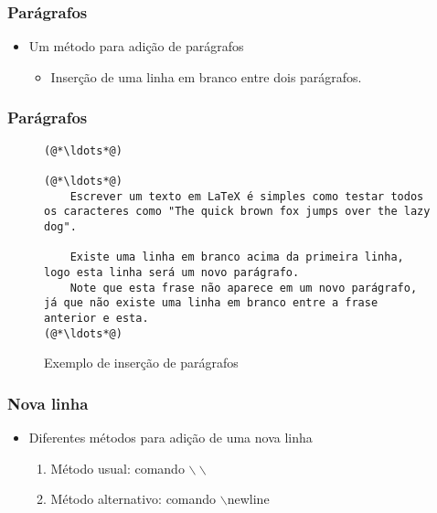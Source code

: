 \begin{frame} \frametitle{Parágrafos}
\begin{itemize}
	\item Um método para adição de parágrafos
	\begin{itemize}
		\item Inserção de uma linha em branco entre dois parágrafos.
	\end{itemize}
\end{itemize}
\end{frame}

\begin{frame}[fragile] \frametitle{Parágrafos}
\begin{figure}[!t]
\caption{Exemplo de inserção de parágrafos}
\begin{lstlisting}
(@*\ldots*@)

(@*\ldots*@)
	Escrever um texto em LaTeX é simples como testar todos os caracteres como "The quick brown fox jumps over the lazy dog".

	Existe uma linha em branco acima da primeira linha, logo esta linha será um novo parágrafo.
	Note que esta frase não aparece em um novo parágrafo, já que não existe uma linha em branco entre a frase anterior e esta.
(@*\ldots*@)

\end{lstlisting}
\ownsrc
\end{figure}
\end{frame}

\begin{frame}[fragile] \frametitle{Nova linha}
\begin{itemize}
	\item Diferentes métodos para adição de uma nova linha
	\begin{enumerate}
		\item Método usual: comando $\backslash\backslash$
		\item Método alternativo: comando $\backslash$newline
	\end{enumerate}
\end{itemize}
\end{frame}

